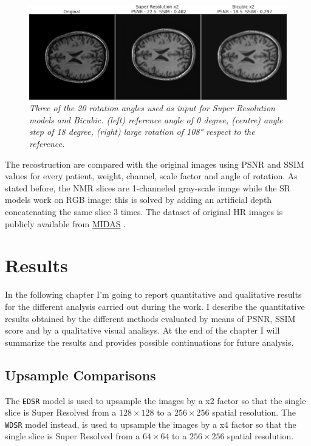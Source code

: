 \documentclass[12pt,a4paper]{report}
\begin{document}
\begin{figure}[H]
 \centering
 \includegraphics[scale=0.3]{images/rotations.png}
 \caption{\it Three of the 20 rotation angles used as input for Super Resolution models and Bicubic. (left) reference angle of 0 degree, (centre) angle step of 18 degree, (right) large rotation of 108° respect to the reference. }
 \label{fig:rotations}
\end{figure}

The recostruction are compared with the original images using PSNR and SSIM values for every patient, weight, channel, scale factor and angle of rotation. 
As stated before, the NMR slices are 1-channeled gray-scale image while the SR models work on RGB image: this is solved by adding an artificial depth concatenating the same slice 3 times. 
The dataset of original HR images is publicly available from \href{http://insight-journal.org/midas/collection/view/190}{MIDAS} \cite{dataset}. 

\chapter{Results}

In the following chapter I'm going to report quantitative and qualitative results for the different analysis carried out during the work.
I describe the quantitative results obtained by the different methods evaluated by means of PSNR, SSIM score and by a qualitative visual analisys.
At the end of the chapter I will summarize the results and provides possible continuations for future analysis.  

\section{Upsample Comparisons}

The {\tt EDSR} model is used to upsample the images by a x2 factor so that the single slice is Super Resolved from a $128 \times 128$ to a $256 \times 256$ spatial resolution. 
The {\tt WDSR} model instead, is used to upsample the images by a x4 factor so that the single slice is Super Resolved from a $64 \times 64$ to a $256 \times 256$ spatial resolution. 
\end{document}
